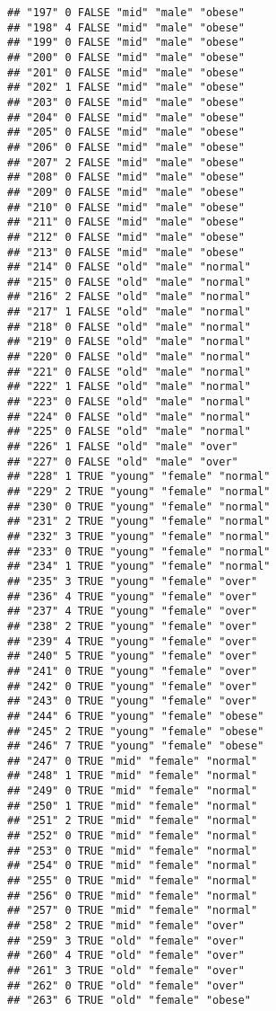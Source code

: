 \documentclass[]{article}
\begin{document}
\begin{verbatim}
## "197" 0 FALSE "mid" "male" "obese"
## "198" 4 FALSE "mid" "male" "obese"
## "199" 0 FALSE "mid" "male" "obese"
## "200" 0 FALSE "mid" "male" "obese"
## "201" 0 FALSE "mid" "male" "obese"
## "202" 1 FALSE "mid" "male" "obese"
## "203" 0 FALSE "mid" "male" "obese"
## "204" 0 FALSE "mid" "male" "obese"
## "205" 0 FALSE "mid" "male" "obese"
## "206" 0 FALSE "mid" "male" "obese"
## "207" 2 FALSE "mid" "male" "obese"
## "208" 0 FALSE "mid" "male" "obese"
## "209" 0 FALSE "mid" "male" "obese"
## "210" 0 FALSE "mid" "male" "obese"
## "211" 0 FALSE "mid" "male" "obese"
## "212" 0 FALSE "mid" "male" "obese"
## "213" 0 FALSE "mid" "male" "obese"
## "214" 0 FALSE "old" "male" "normal"
## "215" 0 FALSE "old" "male" "normal"
## "216" 2 FALSE "old" "male" "normal"
## "217" 1 FALSE "old" "male" "normal"
## "218" 0 FALSE "old" "male" "normal"
## "219" 0 FALSE "old" "male" "normal"
## "220" 0 FALSE "old" "male" "normal"
## "221" 0 FALSE "old" "male" "normal"
## "222" 1 FALSE "old" "male" "normal"
## "223" 0 FALSE "old" "male" "normal"
## "224" 0 FALSE "old" "male" "normal"
## "225" 0 FALSE "old" "male" "normal"
## "226" 1 FALSE "old" "male" "over"
## "227" 0 FALSE "old" "male" "over"
## "228" 1 TRUE "young" "female" "normal"
## "229" 2 TRUE "young" "female" "normal"
## "230" 0 TRUE "young" "female" "normal"
## "231" 2 TRUE "young" "female" "normal"
## "232" 3 TRUE "young" "female" "normal"
## "233" 0 TRUE "young" "female" "normal"
## "234" 1 TRUE "young" "female" "normal"
## "235" 3 TRUE "young" "female" "over"
## "236" 4 TRUE "young" "female" "over"
## "237" 4 TRUE "young" "female" "over"
## "238" 2 TRUE "young" "female" "over"
## "239" 4 TRUE "young" "female" "over"
## "240" 5 TRUE "young" "female" "over"
## "241" 0 TRUE "young" "female" "over"
## "242" 0 TRUE "young" "female" "over"
## "243" 0 TRUE "young" "female" "over"
## "244" 6 TRUE "young" "female" "obese"
## "245" 2 TRUE "young" "female" "obese"
## "246" 7 TRUE "young" "female" "obese"
## "247" 0 TRUE "mid" "female" "normal"
## "248" 1 TRUE "mid" "female" "normal"
## "249" 0 TRUE "mid" "female" "normal"
## "250" 1 TRUE "mid" "female" "normal"
## "251" 2 TRUE "mid" "female" "normal"
## "252" 0 TRUE "mid" "female" "normal"
## "253" 0 TRUE "mid" "female" "normal"
## "254" 0 TRUE "mid" "female" "normal"
## "255" 0 TRUE "mid" "female" "normal"
## "256" 0 TRUE "mid" "female" "normal"
## "257" 0 TRUE "mid" "female" "normal"
## "258" 2 TRUE "mid" "female" "over"
## "259" 3 TRUE "old" "female" "over"
## "260" 4 TRUE "old" "female" "over"
## "261" 3 TRUE "old" "female" "over"
## "262" 0 TRUE "old" "female" "over"
## "263" 6 TRUE "old" "female" "obese"

\end{verbatim}
\end{document}
